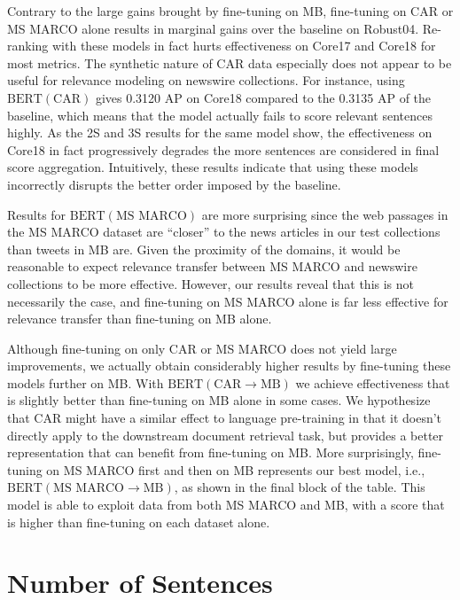 Contrary to the large gains brought by fine-tuning on MB, fine-tuning on CAR or MS MARCO alone results in marginal gains over the baseline on Robust04.
Re-ranking with these models in fact hurts effectiveness on Core17 and Core18 for most metrics.
The synthetic nature of CAR data especially does not appear to be useful for relevance modeling on newswire collections.
For instance, using $ \textrm{BERT}(\textrm{CAR}) $ gives 0.3120 AP on Core18 compared to the 0.3135 AP of the baseline, which means that the model actually fails to score relevant sentences highly.
As the 2S and 3S results for the same model show, the effectiveness on Core18 in fact progressively degrades the more sentences are considered in final score aggregation.
Intuitively, these results indicate that using these models incorrectly disrupts the better order imposed by the baseline.

Results for $ \textrm{BERT}(\textrm{MS MARCO}) $ are more surprising since the web passages in the MS MARCO dataset are ``closer'' to the news articles in our test collections than tweets in MB are.
Given the proximity of the domains, it would be reasonable to expect relevance transfer between MS MARCO and newswire collections to be more effective.
However, our results reveal that this is not necessarily the case, and fine-tuning on MS MARCO alone is far less effective for relevance transfer than fine-tuning on MB alone.

Although fine-tuning on only CAR or MS MARCO does not yield large improvements, we actually obtain considerably higher results by fine-tuning these models further on MB.
With $ \textrm{BERT}(\textrm{CAR}\rightarrow\textrm{MB}) $ we achieve effectiveness that is slightly better than fine-tuning on MB alone in some cases.
We hypothesize that CAR might have a similar effect to language pre-training in that it doesn't directly apply to the downstream document retrieval task, but provides a better representation that can benefit from fine-tuning on MB.
More surprisingly, fine-tuning on MS MARCO first and then on MB represents our best model, i.e., $ \textrm{BERT}(\textrm{MS MARCO}\rightarrow\textrm{MB}) $, as shown in the final block of the table.
This model is able to exploit data from both MS MARCO and MB, with a score that is higher than fine-tuning on each dataset alone.

\section{Number of Sentences}

